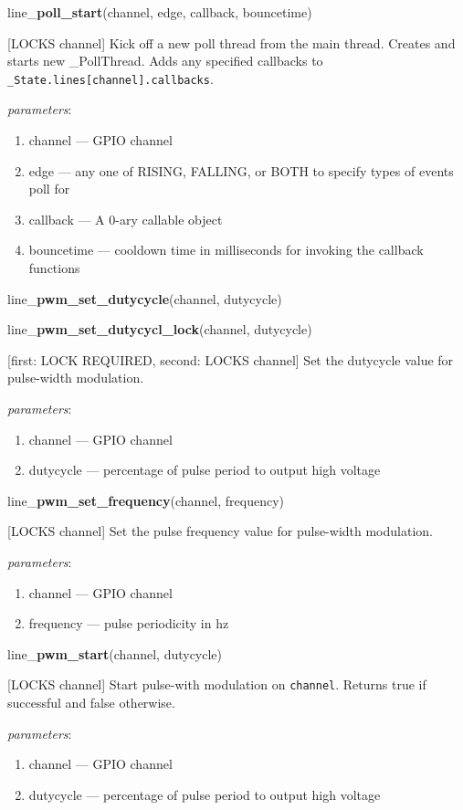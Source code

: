 \documentclass[12pt]{article}
\begin{document}
\noindent line\_\textbf{poll\_start}(channel, edge, callback, bouncetime)

[LOCKS channel] Kick off a new poll thread from the main thread.
Creates and starts new \_PollThread. Adds any specified callbacks to \texttt{\_State.lines[channel].callbacks}. 

\textit{parameters}:
\begin{enumerate}      
        \item channel --- GPIO channel
        \item edge --- any one of RISING, FALLING, or BOTH to specify types of events poll for
        \item callback --- A 0-ary callable object
        \item bouncetime --- cooldown time in milliseconds for invoking the callback functions
\end{enumerate}

\noindent line\_\textbf{pwm\_set\_dutycycle}(channel, dutycycle)

\noindent line\_\textbf{pwm\_set\_dutycycl\_lock}(channel, dutycycle)

[first: LOCK REQUIRED, second: LOCKS channel]
Set the dutycycle value for pulse-width modulation.

\textit{parameters}:
\begin{enumerate}      
        \item channel --- GPIO channel
        \item dutycycle --- percentage of pulse period to output high voltage
\end{enumerate}

\noindent line\_\textbf{pwm\_set\_frequency}(channel, frequency)

[LOCKS channel] Set the pulse frequency value for pulse-width modulation.

\textit{parameters}:
\begin{enumerate}      
        \item channel --- GPIO channel
        \item frequency --- pulse periodicity in hz
\end{enumerate}

\noindent line\_\textbf{pwm\_start}(channel, dutycycle)

[LOCKS channel] Start pulse-with modulation on \texttt{channel}.
Returns true if successful and false otherwise.

\textit{parameters}:
\begin{enumerate}      
        \item channel --- GPIO channel
        \item dutycycle --- percentage of pulse period to output high voltage
\end{enumerate}
\end{document}
